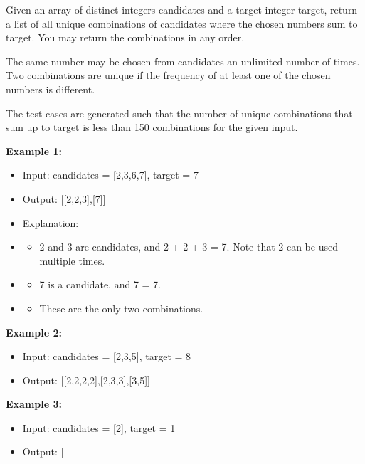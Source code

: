 \documentclass[11pt]{article}
\providecommand{\tightlist}{%
      \setlength{\itemsep}{0pt}\setlength{\parskip}{0pt}}
\begin{document}
Given an array of distinct integers candidates and a target integer
target, return a list of all unique combinations of candidates where the
chosen numbers sum to target. You may return the combinations in any
order.

The same number may be chosen from candidates an unlimited number of
times. Two combinations are unique if the frequency of at least one of
the chosen numbers is different.

The test cases are generated such that the number of unique combinations
that sum up to target is less than 150 combinations for the given input.

\textbf{Example 1:}

\begin{itemize}
\tightlist
\item
  Input: candidates = {[}2,3,6,7{]}, target = 7
\item
  Output: {[}{[}2,2,3{]},{[}7{]}{]}
\item
  Explanation:
\item
  \begin{itemize}
  \tightlist
  \item
    2 and 3 are candidates, and 2 + 2 + 3 = 7. Note that 2 can be used
    multiple times.
  \end{itemize}
\item
  \begin{itemize}
  \tightlist
  \item
    7 is a candidate, and 7 = 7.
  \end{itemize}
\item
  \begin{itemize}
  \tightlist
  \item
    These are the only two combinations.
  \end{itemize}
\end{itemize}

\textbf{Example 2:}

\begin{itemize}
\tightlist
\item
  Input: candidates = {[}2,3,5{]}, target = 8
\item
  Output: {[}{[}2,2,2,2{]},{[}2,3,3{]},{[}3,5{]}{]}
\end{itemize}

\textbf{Example 3:}

\begin{itemize}
\tightlist
\item
  Input: candidates = {[}2{]}, target = 1
\item
  Output: {[}{]}
\end{itemize}
\end{document}
